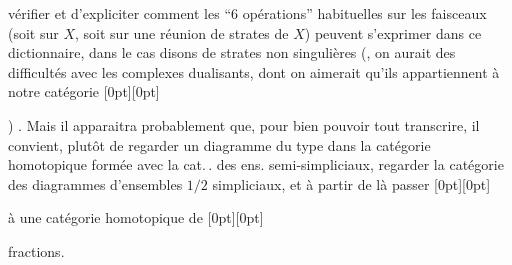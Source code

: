 %
vérifier et d'expliciter comment les ``6 opérations'' habituelles sur les faisceaux (soit sur $X$, soit sur une réunion de strates de $X$) peuvent s'exprimer dans ce dictionnaire, dans le cas disons de strates non singulières (, on aurait des difficultés avec les complexes dualisants, dont on aimerait qu'ils appartiennent à notre catégorie%
\raisebox{0pt}[0pt][0pt]{\parbox{0pt}{}}%
) . Mais il apparaitra probablement que, pour bien pouvoir tout transcrire, il convient, plutôt  de regarder un diagramme du type
dans la catégorie homotopique formée avec la cat.\,. des ens. semi-simpliciaux,  regarder la catégorie des diagrammes d'ensembles $1/2$ simpliciaux, et à partir de là passer%
\raisebox{0pt}[0pt][0pt]{\parbox{0pt}{}} à une catégorie homotopique de %
\raisebox{0pt}[0pt][0pt]{\parbox{0pt}{}}fractions.

